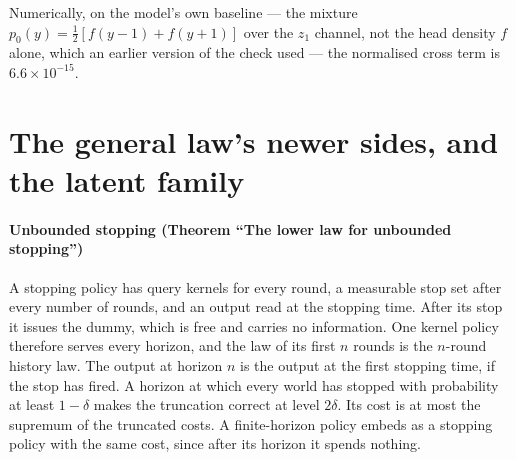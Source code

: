 Numerically, on the model's own baseline --- the mixture $p_{0}(y)=\tfrac12[f(y-1)+f(y+1)]$
over the $z_{1}$ channel, not the head density $f$ alone, which an earlier version of the
check used --- the normalised cross term is $6.6\times10^{-15}$.




\section{The general law's newer sides, and the latent family}
\label{sec:newer}

\paragraph{Unbounded stopping (Theorem ``The lower law for unbounded stopping'')} A stopping
policy has query kernels for every round, a measurable stop set after every number of rounds, and
an output read at the stopping time. After its stop it issues the dummy, which is free and
carries no information. One kernel policy therefore serves every horizon, and the law of its
first $n$ rounds is the $n$-round history law. The output at horizon $n$ is the output at the
first stopping time, if the stop has fired. A horizon at which every world has stopped with
probability at least $1-\delta$ makes the truncation correct at level $2\delta$. Its cost is at most
the supremum of the truncated costs. A finite-horizon policy embeds as a stopping policy with the
same cost, since after its horizon it spends nothing.


